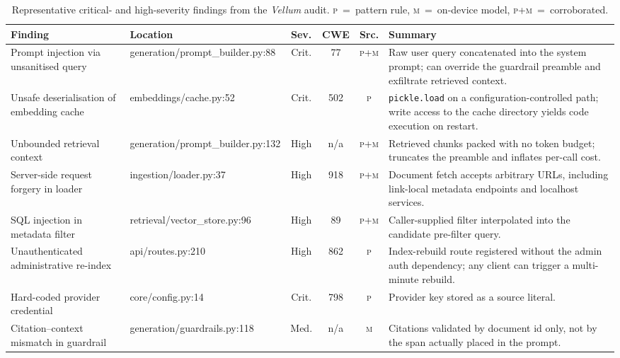 \begin{table}[!tbp]
 \centering
 \caption{Representative critical- and high-severity findings from the
 \textit{Vellum} audit.
 \textsc{p}~=~pattern rule, \textsc{m}~=~on-device model,
 \textsc{p+m}~=~corroborated.}
 \label{tab:findings}
 \renewcommand{\arraystretch}{1.25}
 \small
 \begin{tabularx}{\textwidth}{@{}
 >{\raggedright\arraybackslash}p{}
 >{\ttfamily\scriptsize\raggedright\arraybackslash}p{}
 c c c
 >{\raggedright\arraybackslash}X @{}}
 \toprule
 \textbf{Finding} & \normalfont\textbf{Location} & \textbf{Sev.} &
 \textbf{CWE} & \textbf{Src.} & \textbf{Summary} \\
 \midrule
 Prompt injection via unsanitised query &
 generation/prompt\_builder.py:88 & Crit. & 77 & \textsc{p+m} &
 Raw user query concatenated into the system prompt; can override the
 guardrail preamble and exfiltrate retrieved context. \\
 Unsafe deserialisation of embedding cache &
 embeddings/cache.py:52 & Crit. & 502 & \textsc{p} &
 \texttt{pickle.load} on a configuration-controlled path; write
 access to the cache directory yields code execution on restart. \\
 Unbounded retrieval context &
 generation/prompt\_builder.py:132 & High & n/a & \textsc{p+m} &
 Retrieved chunks packed with no token budget; truncates the
 preamble and inflates per-call cost. \\
 Server-side request forgery in loader &
 ingestion/loader.py:37 & High & 918 & \textsc{p+m} &
 Document fetch accepts arbitrary URLs, including link-local
 metadata endpoints and localhost services. \\
 SQL injection in metadata filter &
 retrieval/vector\_store.py:96 & High & 89 & \textsc{p+m} &
 Caller-supplied filter interpolated into the candidate pre-filter
 query. \\
 Unauthenticated administrative re-index &
 api/routes.py:210 & High & 862 & \textsc{p} &
 Index-rebuild route registered without the admin auth dependency;
 any client can trigger a multi-minute rebuild. \\
 Hard-coded provider credential &
 core/config.py:14 & Crit. & 798 & \textsc{p} &
 Provider key stored as a source literal. \\
 Citation--context mismatch in guardrail &
 generation/guardrails.py:118 & Med. & n/a & \textsc{m} &
 Citations validated by document id only, not by the span actually
 placed in the prompt. \\
 \bottomrule
 \end{tabularx}
\end{table}
